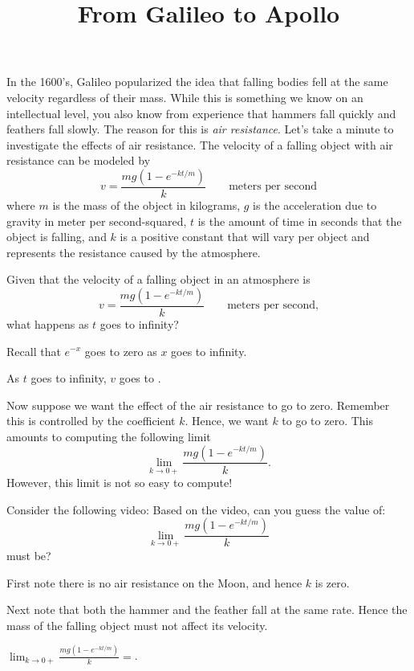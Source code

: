 \documentclass{ximera}
\title[Break-Ground:]{From Galileo to Apollo}
\begin{document}
\begin{abstract}

\end{abstract}
\maketitle



In the 1600's, Galileo popularized the idea that falling bodies fell
at the same velocity regardless of their mass. While this is something
we know on an intellectual level, you also know from experience that
hammers fall quickly and feathers fall slowly. The reason for this is
\textit{air resistance}.  Let's take a minute to investigate the
effects of air resistance. The velocity of a falling object with air
resistance can be modeled by
\[
v = \frac{mg(1-e^{-kt/m})}{k}\qquad\text{meters per second}
\]
where $m$ is the mass of the object in kilograms, $g$ is the
acceleration due to gravity in meter per second-squared, $t$ is the
amount of time in seconds that the object is falling, and $k$ is a
positive constant that will vary per object and represents the
resistance caused by the atmosphere.

\begin{problem}
Given that the velocity of a falling object in an atmosphere is 
\[
v = \frac{mg(1-e^{-kt/m})}{k}\qquad\text{meters per second,}
\]
what happens as $t$ goes to infinity?
\begin{hint}
Recall that $e^{-x}$ goes to zero as $x$ goes to infinity.
\end{hint}
\begin{prompt}
As $t$ goes to infinity, $v$ goes to .
\end{prompt}
\end{problem}


Now suppose we want the effect of the air resistance to go to
zero. Remember this is controlled by the coefficient $k$. Hence, we
want $k$ to go to zero. This amounts to computing the following limit
\[
\lim_{k\to 0+} \frac{mg(1-e^{-kt/m})}{k}.
\]
However, this limit is not so easy to compute!

\begin{problem}
Consider the following video: 
Based on the video, can you guess the value of:
\[
\lim_{k\to 0+} \frac{mg(1-e^{-kt/m})}{k}
\]
must be?
\begin{hint}
First note there is no air resistance on the Moon, and hence $k$ is
zero.
\end{hint}
\begin{hint}
Next note that both the hammer and the feather fall at the same rate.
Hence the mass of the falling object must not affect its velocity.
\end{hint}
\begin{prompt}
$\lim_{k\to 0+}\frac{mg(1-e^{-kt/m})}{k} = $.
\end{prompt}
\end{problem}
\end{document}
